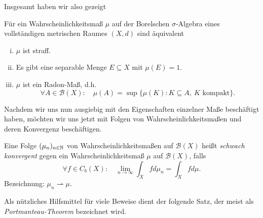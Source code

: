 Insgesamt haben wir also gezeigt

\begin{theorem}
    Für ein Wahrscheinlichkeitsmaß $\mu$ auf der Borelschen $\sigma$-Algebra eines vollständigen metrischen Raumes $(X,d)$ sind äquivalent
    \begin{enumerate}[(i)]
        \item $\mu$ ist straff.
        \item Es gibt eine separable Menge $E \subseteq X$ mit $\mu(E) = 1$.
        \item $\mu$ ist ein Radon-Maß, d.h.
        $$
        \forall A \in \mathcal{B}(X): \quad \mu(A) = \sup\{\mu(K): K \subseteq A, \ K \text{ kompakt}\}.
        $$   
    \end{enumerate}
\end{theorem}

Nachdem wir uns nun ausgiebig mit den Eigenschaften einzelner Maße beschäftigt haben, möchten wir uns jetzt mit Folgen von Wahrscheinlichkeitsmaßen und deren Konvergenz beschäftigen. 

\begin{mydef}
    Eine Folge $(\mu_n)_{n \in \mathbb{N}}$ von Wahrscheinlichkeitsmaßen auf $\mathcal{B}(X)$ heißt \textit{schwach konvergent} 
    gegen ein Wahrscheinlichkeitsmaß $\mu$ auf $\mathcal{B}(X)$, falls 
    $$
        \forall f \in C_b(X): \quad \lim_{n \to \infty} \int_Xfd\mu_n = \int_X fd\mu . 
    $$
    Bezeichnung: $\mu_n \rightharpoonup \mu$. 
\end{mydef}

Als nützliches Hilfsmittel für viele Beweise dient der folgende Satz, der meist als \textit{Portmanteau-Theorem} bezeichnet wird. 
